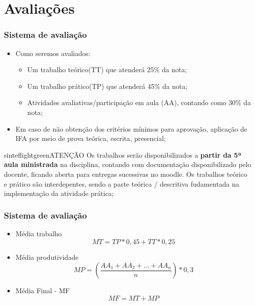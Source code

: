 \documentclass{beamer}
\begin{document}
\section{Avaliações}

\begin{frame}[fragile]\justifying
\frametitle{Sistema de avaliação}
\begin{itemize}
            
            \item Como seremos avaliados:
            \begin{itemize}
                  \item Um trabalho teórico(TT) que atenderá 25\% da nota;
                  \item Um trabalho prático(TP) que atenderá 45\% da nota;
                  \item Atividades avaliativas/participação em aula (AA), contando como 30\% da nota;
            \end{itemize}
            \item Em caso de não obtenção dos critérios mínimos para aprovação, aplicação de IFA por meio de prova teórica, escrita, presencial;
\end{itemize}
\begin{colorblock}[black]{sinteflightgreen}{ATENÇÃO}
      Os trabalhos serão disponibilizados a \textbf{partir da 5ª aula ministrada} na disciplina, contando com documentação disponibilizado pelo docente, ficando aberta para entregas sucessivas no moodle.
      Os trabalhos teórico e prático são interdepentes, sendo a parte teórica / descritiva fudamentada na implementação da atividade prática;
\end{colorblock}

\end{frame}

\begin{frame}[fragile]\justifying
      \frametitle{Sistema de avaliação}
      \begin{itemize}
            \item Média trabalho \[ MT = TP * 0,45 + TT * 0,25\]
            \item Média produtividade \[ MP = \left ( \frac{AA_1 + AA_2 + ... + AA_n}n \right ) * 0,3 \]
            \item Média Final - MF \[MF = MT + MP\]
      \end{itemize}
      
      \end{frame}
\end{document}
